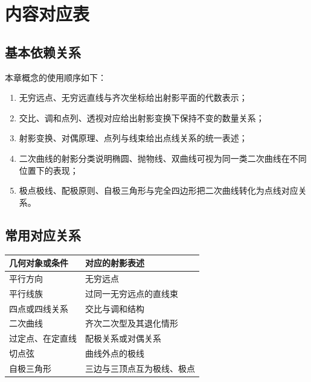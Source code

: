 \chapter{内容对应表}

\section{基本依赖关系}
本章概念的使用顺序如下：

\begin{enumerate}
    \item 无穷远点、无穷远直线与齐次坐标给出射影平面的代数表示；
    \item 交比、调和点列、透视对应给出射影变换下保持不变的数量关系；
    \item 射影变换、对偶原理、点列与线束给出点线关系的统一表述；
    \item 二次曲线的射影分类说明椭圆、抛物线、双曲线可视为同一类二次曲线在不同位置下的表现；
    \item 极点极线、配极原则、自极三角形与完全四边形把二次曲线转化为点线对应关系。
\end{enumerate}

\section{常用对应关系}
\begin{center}
\begin{tabular}{@{}ll@{}}
\toprule
几何对象或条件 & 对应的射影表述 \\
\midrule
平行方向 & 无穷远点 \\
平行线族 & 过同一无穷远点的直线束 \\
四点或四线关系 & 交比与调和结构 \\
二次曲线 & 齐次二次型及其退化情形 \\
过定点、在定直线 & 配极关系或对偶关系 \\
切点弦 & 曲线外点的极线 \\
自极三角形 & 三边与三顶点互为极线、极点 \\
\bottomrule
\end{tabular}
\end{center}



